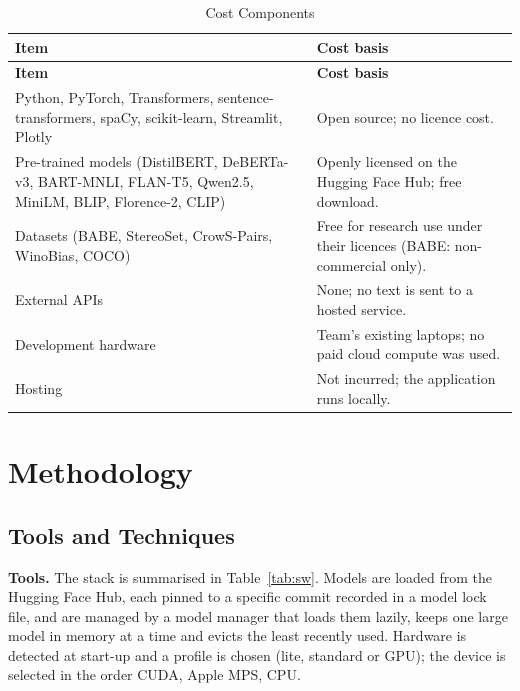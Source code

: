\documentclass[12pt,a4paper,oneside]{report}
\begin{document}
\begin{longtable}{|L{5.4cm}|L{8.8cm}|}
\caption{Cost Components}\label{tab:cost}\\
\hline
\textbf{Item} & \textbf{Cost basis}\\ \hline\endfirsthead
\hline \textbf{Item} & \textbf{Cost basis}\\ \hline\endhead
Python, PyTorch, Transformers, sentence-transformers, spaCy, scikit-learn, Streamlit, Plotly & Open source; no licence
cost.\\ \hline
Pre-trained models (DistilBERT, DeBERTa-v3, BART-MNLI, FLAN-T5, Qwen2.5, MiniLM, BLIP, Florence-2, CLIP) & Openly
licensed on the Hugging Face Hub; free download.\\ \hline
Datasets (BABE, StereoSet, CrowS-Pairs, WinoBias, COCO) & Free for research use under their licences (BABE:
non-commercial only).\\ \hline
External APIs & None; no text is sent to a hosted service.\\ \hline
Development hardware & Team's existing laptops; no paid cloud compute was used.\\ \hline
Hosting & Not incurred; the application runs locally.\\ \hline
\end{longtable}

\chapter{Methodology}\label{ch:method}

\section{Tools and Techniques}
\textbf{Tools.} The stack is summarised in Table~\ref{tab:sw}. Models are loaded from the Hugging Face Hub, each pinned
to a specific commit recorded in a model lock file, and are managed by a model manager that loads them lazily, keeps one
large model in memory at a time and evicts the least recently used. Hardware is detected at start-up and a profile is
chosen (lite, standard or GPU); the device is selected in the order CUDA, Apple MPS, CPU.
\end{document}
